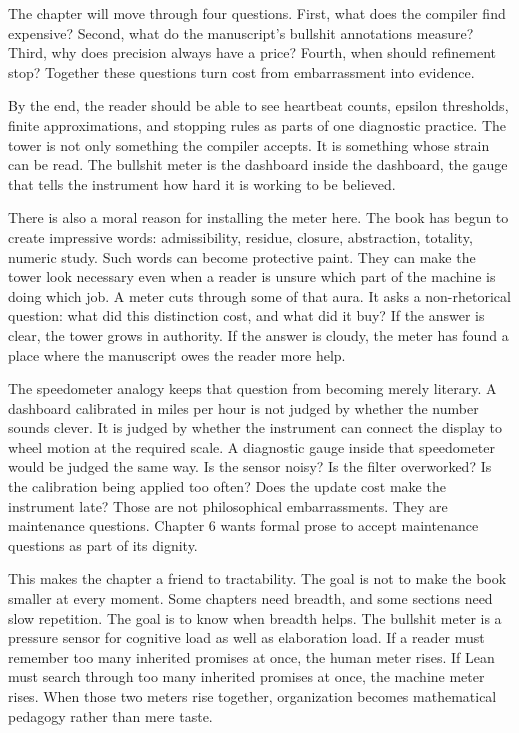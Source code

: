 The chapter will move through four questions. First, what does the compiler
find expensive? Second, what do the manuscript's bullshit annotations measure?
Third, why does precision always have a price? Fourth, when should refinement
stop? Together these questions turn cost from embarrassment into evidence.

By the end, the reader should be able to see heartbeat counts, epsilon
thresholds, finite approximations, and stopping rules as parts of one
diagnostic practice. The tower is not only something the compiler accepts. It
is something whose strain can be read. The bullshit meter is the dashboard
inside the dashboard, the gauge that tells the instrument how hard it is
working to be believed.

There is also a moral reason for installing the meter here. The book has begun
to create impressive words: admissibility, residue, closure, abstraction,
totality, numeric study. Such words can become protective paint. They can make
the tower look necessary even when a reader is unsure which part of the machine
is doing which job. A meter cuts through some of that aura. It asks a
non-rhetorical question: what did this distinction cost, and what did it buy?
If the answer is clear, the tower grows in authority. If the answer is cloudy,
the meter has found a place where the manuscript owes the reader more help.

The speedometer analogy keeps that question from becoming merely literary. A
dashboard calibrated in miles per hour is not judged by whether the number
sounds clever. It is judged by whether the instrument can connect the display
to wheel motion at the required scale. A diagnostic gauge inside that
speedometer would be judged the same way. Is the sensor noisy? Is the filter
overworked? Is the calibration being applied too often? Does the update cost
make the instrument late? Those are not philosophical embarrassments. They are
maintenance questions. Chapter 6 wants formal prose to accept maintenance
questions as part of its dignity.

This makes the chapter a friend to tractability. The goal is not to make the
book smaller at every moment. Some chapters need breadth, and some sections
need slow repetition. The goal is to know when breadth helps. The bullshit
meter is a pressure sensor for cognitive load as well as elaboration load. If a
reader must remember too many inherited promises at once, the human meter
rises. If Lean must search through too many inherited promises at once, the
machine meter rises. When those two meters rise together, organization becomes
mathematical pedagogy rather than mere taste.

